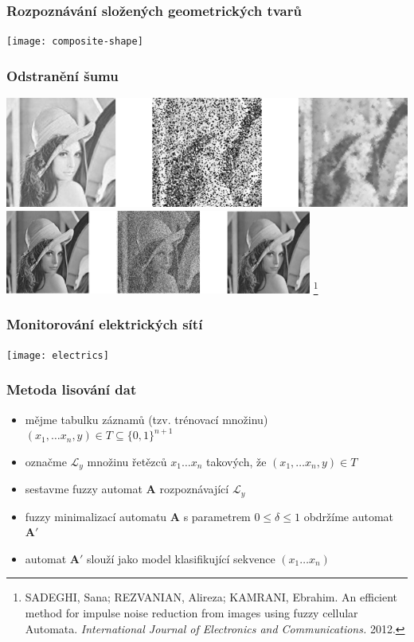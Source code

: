 \documentclass{beamer}
\begin{document}
\begin{frame}	%
\frametitle{Rozpoznávání složených geometrických tvarů}
\centering
\texttt{[image: composite-shape]}
\end{frame}

\begin{frame}	%
\frametitle{Odstranění šumu}
\centering
\includegraphics{noises-my}
\vfill \pause
\includegraphics{noises-cited}
\let\thefootnote\relax\footnote[1]{SADEGHI, Sana; REZVANIAN, Alireza; KAMRANI, Ebrahim. An efficient method for impulse noise reduction from images using fuzzy cellular Automata. \textit{International Journal of Electronics and Communications.} 2012.}
\end{frame}

\begin{frame}	%
\frametitle{Monitorování elektrických sítí}
\centering
\texttt{[image: electrics]}
\end{frame}

\begin{frame}	%
\frametitle{Metoda lisování dat}
\begin{itemize}
	\item mějme tabulku záznamů (tzv. trénovací množinu) $(x_1, \dots x_n, y) \in T \subseteq \{0, 1\}^{n+1}$
	\item označme $\mathcal{L}_y$ množinu řetězců $x_1 \dots x_n$ takových, že $(x_1, \dots x_n, y) \in T$
	\item sestavme fuzzy automat $\mathbf{A}$ rozpoznávající $\mathcal{L}_y$
	\item fuzzy minimalizací automatu $\mathbf{A}$ s parametrem $0 \leq \delta \leq 1$ obdržíme automat $\mathbf{A}'$
	\item automat $\mathbf{A}'$ slouží jako model klasifikující sekvence $(x_1 \dots x_n)$
\end{itemize}
\end{frame}
\end{document}
